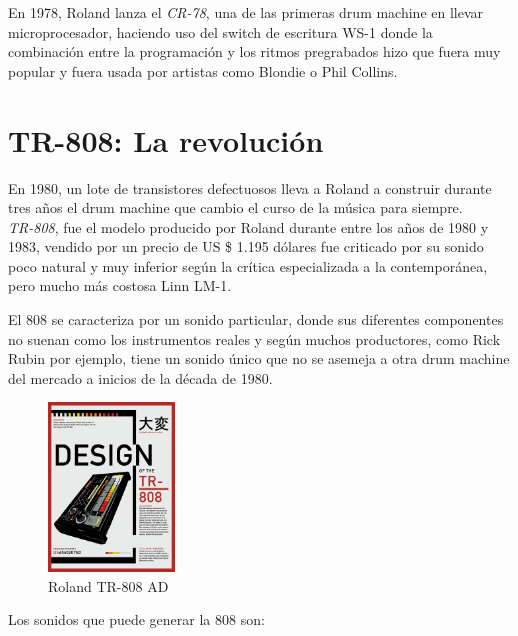 \documentclass{article}
\begin{document}
En 1978, Roland lanza el \emph{CR-78}, una de las primeras drum machine en llevar microprocesador, haciendo uso del switch de escritura WS-1 donde la combinación entre la programación y los ritmos pregrabados hizo que fuera muy popular y fuera usada por artistas como Blondie o Phil Collins.\cite{14drums}

\endgroup

\section{TR-808: La revolución}

En 1980, un lote de transistores defectuosos lleva a Roland a construir durante tres años el drum machine que cambio el curso de la música para siempre.\cite{808film}\\

\emph{TR-808}, fue el modelo producido por Roland durante entre los años de 1980 y 1983, vendido por un precio de US \$ 1.195 dólares fue criticado por su sonido poco natural y muy inferior según la crítica especializada a la contemporánea, pero mucho más costosa Linn LM-1.\\

\begingroup
\setlength{\intextsep}{0pt}%
\setlength{\columnsep}{0pt}%

El 808 se caracteriza por un sonido particular, donde sus diferentes componentes no suenan como los instrumentos reales y según muchos productores, como Rick Rubin por ejemplo, tiene un sonido único que no se asemeja a otra drum machine del mercado a inicios de la década de 1980.\\

\begin{figure}
    \centering
    \includegraphics[width=0.3\textwidth]{images/808ad.jpg}
    \vspace{-5pt}
    \caption{Roland TR-808 AD}
\end{figure}

Los sonidos que puede generar la 808 son\cite{808tspecs}:
\end{document}
